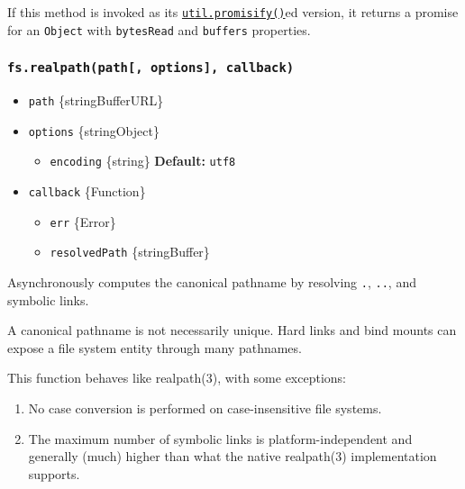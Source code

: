 If this method is invoked as its
\href{util.md\#utilpromisifyoriginal}{\texttt{util.promisify()}}ed
version, it returns a promise for an \texttt{Object} with
\texttt{bytesRead} and \texttt{buffers} properties.

\subsubsection{\texorpdfstring{\texttt{fs.realpath(path{[},\ options{]},\ callback)}}{fs.realpath(path{[}, options{]}, callback)}}\label{fs.realpathpath-options-callback}

\begin{itemize}
\tightlist
\item
  \texttt{path} \{string\textbar Buffer\textbar URL\}
\item
  \texttt{options} \{string\textbar Object\}

  \begin{itemize}
  \tightlist
  \item
    \texttt{encoding} \{string\} \textbf{Default:}
    \texttt{\textquotesingle{}utf8\textquotesingle{}}
  \end{itemize}
\item
  \texttt{callback} \{Function\}

  \begin{itemize}
  \tightlist
  \item
    \texttt{err} \{Error\}
  \item
    \texttt{resolvedPath} \{string\textbar Buffer\}
  \end{itemize}
\end{itemize}

Asynchronously computes the canonical pathname by resolving \texttt{.},
\texttt{..}, and symbolic links.

A canonical pathname is not necessarily unique. Hard links and bind
mounts can expose a file system entity through many pathnames.

This function behaves like realpath(3), with some exceptions:

\begin{enumerate}
\def\labelenumi{\arabic{enumi}.}
\item
  No case conversion is performed on case-insensitive file systems.
\item
  The maximum number of symbolic links is platform-independent and
  generally (much) higher than what the native realpath(3)
  implementation supports.
\end{enumerate}

